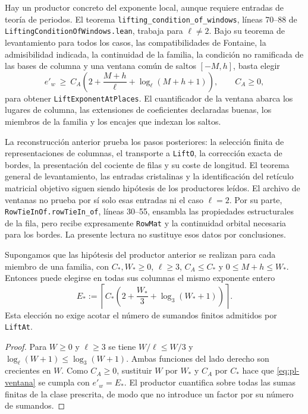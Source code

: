 Hay un productor concreto del exponente local, aunque requiere
entradas de teoría de periodos. El teorema
\texttt{lifting\_condition\_of\_windows}, líneas 70--88 de
\texttt{LiftingConditionOfWindows.lean}, trabaja para $\ell\ne2$.
Bajo su teorema de levantamiento para todos los casos, las
compatibilidades de Fontaine, la admisibilidad indicada, la
continuidad de la familia, la condición no ramificada de las bases
de columna y una ventana común de saltos $[-M,h]$, basta elegir
\begin{equation}
 e'_w\ \geq\ C_A\left(2+\frac{M+h}{\ell}
                       +\log_\ell(M+h+1)\right),
 \qquad C_A\geq0,
 \label{eq:pl-ventana}
\end{equation}
para obtener \texttt{LiftExponentAtPlaces}. El cuantificador de
la ventana abarca los lugares de columna, las extensiones de
coeficientes declaradas buenas, los miembros de la familia y los
encajes que indexan los saltos.

La reconstrucción anterior prueba los pasos posteriores: la
selección finita de representaciones de columnas, el transporte a
\texttt{LiftO}, la corrección exacta de bordes, la presentación del
cociente de filas y su coste de longitud. El teorema general de
levantamiento, las entradas cristalinas y la identificación del
retículo matricial objetivo siguen siendo hipótesis de los
productores leídos. El archivo de ventanas no prueba por sí solo
esas entradas ni el caso $\ell=2$. Por su parte,
\texttt{RowTieInOf.rowTieIn\_of}, líneas 30--55, ensambla las
propiedades estructurales de la fila, pero recibe expresamente
\texttt{RowMat} y la continuidad orbital necesaria para los bordes.
La presente lectura no sustituye esos datos por conclusiones.

\begin{proposicion}
\label{prop:lu-ventana-comun}
Supongamos que las hipótesis del productor anterior se realizan
para cada miembro de una familia, con $C_*,W_*\ge0$,
$\ell\ge3$, $C_A\le C_*$ y
$0\le M+h\le W_*$. Entonces puede elegirse en todas sus columnas
el mismo exponente entero
\begin{equation}
 E_*:=\left\lceil C_*\left(2+\frac{W_*}{3}
                       +\log_3(W_*+1)\right)\right\rceil.
 \label{eq:lu-exponente-comun}
\end{equation}
Esta elección no exige acotar el número de sumandos finitos
admitidos por \texttt{LiftAt}.
\end{proposicion}
\begin{proof}
Para $W\ge0$ y $\ell\ge3$ se tiene
$W/\ell\le W/3$ y
$\log_\ell(W+1)\le\log_3(W+1)$. Ambas funciones del lado derecho
son crecientes en $W$. Como $C_A\ge0$, sustituir $W$ por $W_*$
y $C_A$ por $C_*$ hace que \eqref{eq:pl-ventana} se cumpla con
$e'_w=E_*$. El productor cuantifica sobre todas las sumas finitas
de la clase prescrita, de modo que no introduce un factor por
su número de sumandos.
\end{proof}

